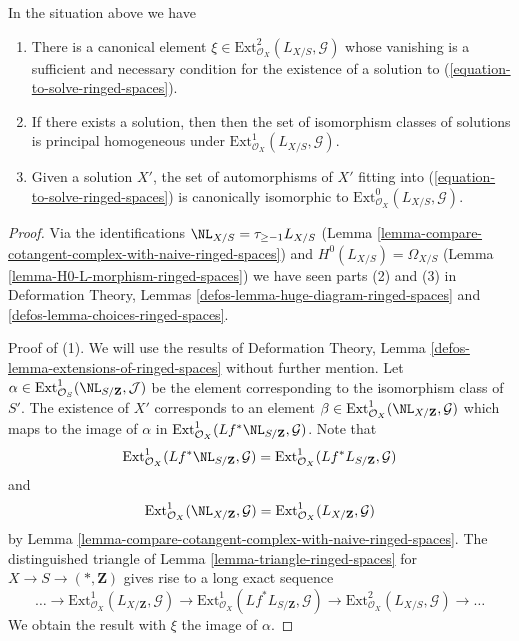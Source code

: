 \begin{lemma}
\label{lemma-find-obstruction-ringed-spaces}
In the situation above we have
\begin{enumerate}
\item There is a canonical element
$\xi \in \text{Ext}^2_{\mathcal{O}_X}(L_{X/S}, \mathcal{G})$
whose vanishing is a sufficient and necessary condition for the existence
of a solution to (\ref{equation-to-solve-ringed-spaces}).
\item If there exists a solution, then then the set of
isomorphism classes of solutions is principal homogeneous under
$\text{Ext}^1_{\mathcal{O}_X}(L_{X/S}, \mathcal{G})$.
\item Given a solution $X'$, the set of automorphisms of $X'$
fitting into (\ref{equation-to-solve-ringed-spaces}) is canonically isomorphic
to $\text{Ext}^0_{\mathcal{O}_X}(L_{X/S}, \mathcal{G})$.
\end{enumerate}
\end{lemma}

\begin{proof}
Via the identifications $\NL_{X/S} = \tau_{\geq -1}L_{X/S}$
(Lemma \ref{lemma-compare-cotangent-complex-with-naive-ringed-spaces})
and
$H^0(L_{X/S}) = \Omega_{X/S}$
(Lemma \ref{lemma-H0-L-morphism-ringed-spaces})
we have seen parts (2) and (3) in
Deformation Theory, Lemmas \ref{defos-lemma-huge-diagram-ringed-spaces} and
\ref{defos-lemma-choices-ringed-spaces}.

\medskip\noindent
Proof of (1). We will use the results of
Deformation Theory, Lemma \ref{defos-lemma-extensions-of-ringed-spaces}
without further mention.
Let $\alpha \in \text{Ext}^1_{\mathcal{O}_S}(\NL_{S/\mathbf{Z}}, \mathcal{J})$
be the element corresponding to the isomorphism class of $S'$.
The existence of $X'$ corresponds to an element
$\beta \in \text{Ext}_{\mathcal{O}_X}^1(\NL_{X/\mathbf{Z}}, \mathcal{G})$
which maps to the image of $\alpha$ in
$\text{Ext}^1_{\mathcal{O}_X}(Lf^*\NL_{S/\mathbf{Z}}, \mathcal{G})$.
Note that
$$
\text{Ext}^1_{\mathcal{O}_X}(Lf^*\NL_{S/\mathbf{Z}}, \mathcal{G}) =
\text{Ext}^1_{\mathcal{O}_X}(Lf^*L_{S/\mathbf{Z}}, \mathcal{G})
$$
and
$$
\text{Ext}^1_{\mathcal{O}_X}(\NL_{X/\mathbf{Z}}, \mathcal{G}) =
\text{Ext}^1_{\mathcal{O}_X}(L_{X/\mathbf{Z}}, \mathcal{G})
$$
by Lemma \ref{lemma-compare-cotangent-complex-with-naive-ringed-spaces}.
The distinguished triangle of Lemma \ref{lemma-triangle-ringed-spaces}
for $X \to S \to (*, \mathbf{Z})$ gives rise to a long exact sequence
$$
\ldots \to
\text{Ext}^1_{\mathcal{O}_X}(L_{X/\mathbf{Z}}, \mathcal{G}) \to
\text{Ext}^1_{\mathcal{O}_X}(Lf^*L_{S/\mathbf{Z}}, \mathcal{G}) \to
\text{Ext}^2_{\mathcal{O}_X}(L_{X/S}, \mathcal{G}) \to \ldots
$$
We obtain the result with $\xi$ the image of $\alpha$.
\end{proof}










